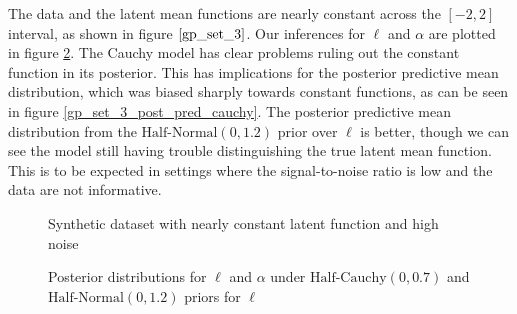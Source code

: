 \documentclass{article}
\begin{document}
The data and the latent mean functions are nearly constant across the $[-2,2]$
interval, as shown in figure $\ref{gp_set_3}$. Our inferences for $\ell$ and $\alpha$
are plotted in figure \ref{gp_set_3_len}. The Cauchy model has clear problems ruling
out the constant function in its posterior. This has implications for the 
posterior predictive mean distribution, which was biased sharply towards
constant functions, as can be seen in figure \ref{gp_set_3_post_pred_cauchy}. The
posterior predictive mean distribution from the $\text{Half-Normal}(0, 1.2)$
prior over $\ell$ is better, though we can see the model still having trouble
distinguishing the true latent mean function. This is to be expected in settings
where the signal-to-noise ratio is low and the data are not informative.
\begin{figure}[htbp]
  \centering
  \caption{Synthetic dataset with nearly constant latent function and high noise} \label{gp_set_3}
\end{figure}
\begin{figure}[htbp]
  \centering
  \caption{Posterior distributions for $\ell$ and $\alpha$ under
  $\text{Half-Cauchy}(0, 0.7)$ and $\text{Half-Normal}(0, 1.2)$ priors for $\ell$} \label{gp_set_3_len}
\end{figure}
\end{document}
